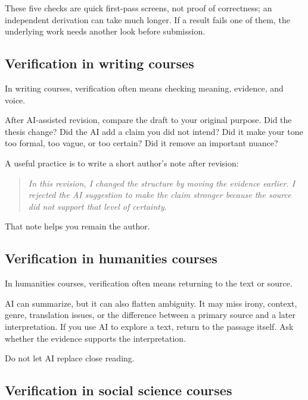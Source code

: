 \documentclass{SIAMbook2023}
\newcommand{\studentprompt}[1]{\begin{quote}\small\itshape #1\end{quote}}
\begin{document}
These five checks are quick first-pass screens, not proof of correctness; an independent derivation can take much longer. If a result fails one of them, the underlying work needs another look before submission.

\subsection{Verification in writing courses}
\label{subsec:writing-verification}%

In writing courses, verification often means checking meaning, evidence, and voice.

After AI-assisted revision, compare the draft to your original purpose. Did the thesis change? Did the AI add a claim you did not intend? Did it make your tone too formal, too vague, or too certain? Did it remove an important nuance?

A useful practice is to write a short author's note after revision:

\studentprompt{In this revision, I changed the structure by moving the evidence earlier. I rejected the AI suggestion to make the claim stronger because the source did not support that level of certainty.}

That note helps you remain the author.

\subsection{Verification in humanities courses}
\label{subsec:humanities-verification}%

In humanities courses, verification often means returning to the text or source.

AI can summarize, but it can also flatten ambiguity. It may miss irony, context, genre, translation issues, or the difference between a primary source and a later interpretation. If you use AI to explore a text, return to the passage itself. Ask whether the evidence supports the interpretation.

Do not let AI replace close reading.

\subsection{Verification in social science courses}
\label{subsec:social-science-verification}%
\end{document}
